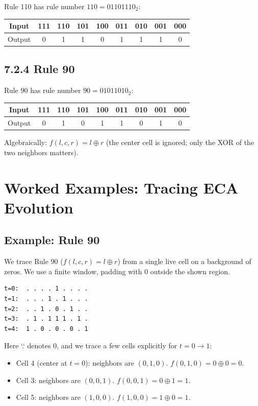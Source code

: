 Rule 110 has rule number $110 = 01101110_2$:

\begin{center}
\begin{tabular}{ccccccccc}
\toprule
Input & 111 & 110 & 101 & 100 & 011 & 010 & 001 & 000 \\
\midrule
Output & 0 & 1 & 1 & 0 & 1 & 1 & 1 & 0 \\
\bottomrule
\end{tabular}
\end{center}

\subsection{7.2.4 Rule 90}

Rule 90 has rule number $90 = 01011010_2$:

\begin{center}
\begin{tabular}{ccccccccc}
\toprule
Input & 111 & 110 & 101 & 100 & 011 & 010 & 001 & 000 \\
\midrule
Output & 0 & 1 & 0 & 1 & 1 & 0 & 1 & 0 \\
\bottomrule
\end{tabular}
\end{center}

Algebraically: $f(l, c, r) = l \oplus r$ (the center cell is ignored; only the XOR of the two neighbors matters).


\section{Worked Examples: Tracing ECA Evolution}

\subsection*{Example: Rule 90}

We trace Rule 90 ($f(l,c,r) = l \oplus r$) from a single live cell on a background of zeros. We use a finite window, padding with 0 outside the shown region.

\begin{verbatim}
t=0:  . . . . 1 . . . .
t=1:  . . . 1 . 1 . . .
t=2:  . . 1 . 0 . 1 . .
t=3:  . 1 . 1 1 1 . 1 .
t=4:  1 . 0 . 0 . 0 . 1
\end{verbatim}

Here `.` denotes 0, and we trace a few cells explicitly for $t = 0 \to 1$:

\begin{itemize}
\item Cell 4 (center at $t=0$): neighbors are $(0, 1, 0)$. $f(0,1,0) = 0 \oplus 0 = 0$.
\item Cell 3: neighbors are $(0, 0, 1)$. $f(0,0,1) = 0 \oplus 1 = 1$.
\item Cell 5: neighbors are $(1, 0, 0)$. $f(1,0,0) = 1 \oplus 0 = 1$.
\end{itemize}

